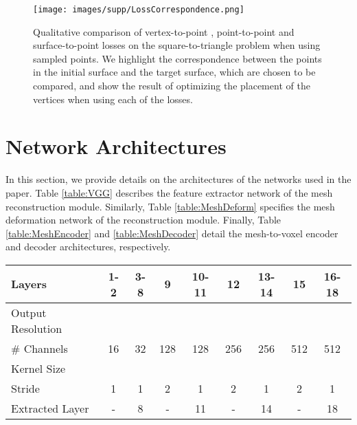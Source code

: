 \documentclass{article}
\begin{document}
\vspace{-2mm}
\begin{figure}[h!]
\centering
\texttt{[image: images/supp/LossCorrespondence.png]}
\vspace{-2mm}
\caption{Qualitative comparison of vertex-to-point \cite{Pixel2Mesh}, point-to-point and surface-to-point losses on the square-to-triangle problem when using  sampled points. We highlight the correspondence between the points in the initial surface and the target surface, which are chosen to be compared, and show the result of optimizing the placement of the vertices when using each of the losses.} \label{fig:SecondLossComparison}
\end{figure}

\clearpage

\section{Network Architectures}

In this section, we provide details on the architectures of the networks used in the paper. Table \ref{table:VGG} describes the feature extractor network of the mesh reconstruction module. Similarly, Table \ref{table:MeshDeform} specifies the mesh deformation network of the reconstruction module. Finally, Table \ref{table:MeshEncoder} and \ref{table:MeshDecoder} detail the mesh-to-voxel encoder and decoder architectures, respectively. 

\begin{table*}[ht]
\centering
\begin{tabular}{|l|c|c|c|c|c|c|c|c|}
\hline
Layers          & 1-2 & 3-8 & 9   & 10-11 & 12  & 13-14 & 15  & 16-18 \\ \hline
Output Resolution    &  &  &    &  &   &  &   &  \\ \hline
\# Channels     & 16  & 32  & 128 & 128   & 256 & 256   & 512 & 512   \\ \hline
Kernel Size     &  &  &  &  &  &  &  &   \\ \hline
Stride     & 1   & 1   & 2   & 1     & 2   & 1     & 2   & 1     \\ \hline
Extracted Layer & -   & 8   & -   & 11    & -   & 14    & -   & 18    \\ \hline
\end{tabular}
\caption{\textbf{Feature extraction network:} Details of the convolutional neural network architecture used to extract image features. Each layer performs a 2D convolutional, followed by batch normalization \cite{ioffe2015batch} and a ReLU activation function \cite{nair2010rectified}. The last row indicates which layer's features are extracted for use in the mesh reconstruction module.}
\label{table:VGG}
\end{table*}
\end{document}
